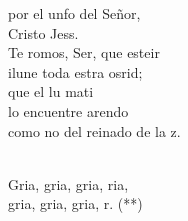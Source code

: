 \documentclass[12pt]{article}
\begin{document}
\begin{multicols*}{2}
\begin{cancion}
	por el unfo del Señor, \\
	Cristo Jess. \\
	Te romos, Ser, que esteir\\
	ilune toda estra osrid; \\
	que el lu mati\\
	lo encuentre arendo\\
	como no del reinado de la z.\\\jump\\
	\begin{chorus}%
	Gria, gria, gria, ria,\\
	gria, gria, gria, r. (**)\\
	\end{chorus}%
	\jump\\
\end{cancion}%


\end{multicols*}
\end{document}

